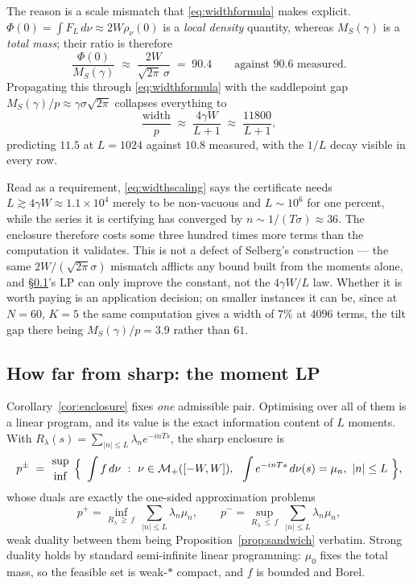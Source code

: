 \documentclass[11pt]{article}
\begin{document}
The reason is a scale mismatch that \eqref{eq:widthformula} makes explicit. $\Phi(0)=\int F_L\,d\nu
\approx 2W\rho_\nu(0)$ is a \emph{local density} quantity, whereas $M_S(\gamma)$ is a \emph{total
mass}; their ratio is therefore
\[
  \frac{\Phi(0)}{M_S(\gamma)}\;\approx\;\frac{2W}{\sqrt{2\pi}\,\sigma}\;=\;90.4
  \qquad\text{against } 90.6 \text{ measured.}
\]
Propagating this through \eqref{eq:widthformula} with the saddlepoint gap
$M_S(\gamma)/p\approx\gamma\sigma\sqrt{2\pi}$ collapses everything to
\begin{equation}
  \label{eq:widthscaling}
  \frac{\mathrm{width}}{p}\;\approx\;\frac{4\gamma W}{L+1}\;\approx\;\frac{11800}{L+1},
\end{equation}
predicting $11.5$ at $L=1024$ against $10.8$ measured, with the $1/L$ decay visible in every row.

Read as a requirement, \eqref{eq:widthscaling} says the certificate needs $L\gtrsim4\gamma W\approx
1.1\times10^4$ merely to be non-vacuous and $L\sim10^6$ for one percent, while the series it is
certifying has converged by $n\sim1/(T\sigma)\approx36$. The enclosure therefore costs some three
hundred times more terms than the computation it validates. This is not a defect of Selberg's
construction --- the same $2W/(\sqrt{2\pi}\sigma)$ mismatch afflicts any bound built from the
moments alone, and \S\ref{sec:sharp}'s LP can only improve the constant, not the $4\gamma W/L$ law.
Whether it is worth paying is an application decision; on smaller instances it can be, since at
$N=60$, $K=5$ the same computation gives a width of $7\%$ at $4096$ terms, the tilt gap there being
$M_S(\gamma)/p=3.9$ rather than $61$.

\subsection{How far from sharp: the moment LP}
\label{sec:sharp}

Corollary~\ref{cor:enclosure} fixes \emph{one} admissible pair. Optimising over all of them is a
linear program, and its value is the exact information content of $L$ moments. With
$R_\lambda(s)=\sum_{|n|\le L}\lambda_n e^{-inTs}$, the sharp enclosure is
\begin{equation}
  \label{eq:primal}
  p^{\pm}\;=\;\genfrac{}{}{0pt}{}{\sup}{\inf}\ \Big\{\ \int f\,d\nu\ :\ \nu\in\mathcal M_+([-W,W]),\ \
  \int e^{-inTs}\,d\nu(s)=\mu_n,\ |n|\le L\ \Big\},
\end{equation}
whose duals are exactly the one-sided approximation problems
\begin{equation}
  \label{eq:dual}
  p^{+}=\inf_{R_\lambda\,\ge\,f}\ \sum_{|n|\le L}\lambda_n\mu_n,
  \qquad
  p^{-}=\sup_{R_\lambda\,\le\,f}\ \sum_{|n|\le L}\lambda_n\mu_n ,
\end{equation}
weak duality between them being Proposition~\ref{prop:sandwich} verbatim. Strong duality holds by
standard semi-infinite linear programming: $\mu_0$ fixes the total mass, so the feasible set is
weak-$*$ compact, and $f$ is bounded and Borel.
\end{document}
